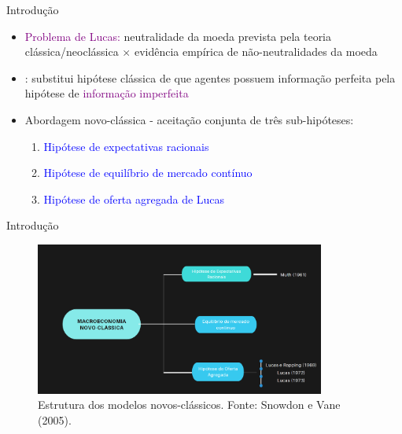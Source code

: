 \documentclass[10pt]{beamer}
\begin{document}
\begin{frame}{Introdução}
    \begin{itemize}
        \item \textcolor{purple}{Problema de Lucas:} neutralidade da moeda prevista pela teoria clássica/neoclássica $\times$ evidência empírica de não-neutralidades da moeda
        \bigskip
        \item {}: substitui hipótese clássica de que agentes possuem informação perfeita pela hipótese de \textcolor{purple}{informação imperfeita}
        \bigskip
        \item Abordagem novo-clássica - aceitação conjunta de três sub-hipóteses:
        \bigskip
        \begin{enumerate}
            \item \textcolor{blue}{Hipótese de expectativas racionais}
            \bigskip
            \item \textcolor{blue}{Hipótese de equilíbrio de mercado contínuo}
            \bigskip
            \item \textcolor{blue}{Hipótese de oferta agregada de Lucas}
        \end{enumerate}        
    \end{itemize}
\end{frame}

\begin{frame}{Introdução}
    \begin{figure}
        \centering
        \includegraphics[width=0.85\textwidth]{./figures/aula11_fig6.PNG}
        \caption{Estrutura dos modelos novos-clássicos. Fonte: Snowdon e Vane (2005).}
        \label{fig3}
    \end{figure}
\end{frame}
\end{document}
